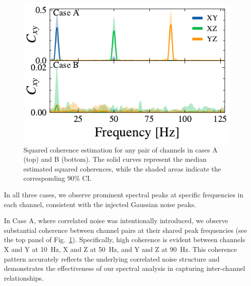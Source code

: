 \documentclass[%
 reprint,
 amsmath,amssymb,
 aps,
 nofootinbib,
]{revtex4-2}
\begin{document}
\begin{figure}
  \includegraphics[width=\columnwidth]{caseAB_coh.pdf}
  \caption{Squared coherence estimation for any pair of channels in cases A (top) and B (bottom). The solid curves represent the median estimated squared coherences, while the shaded areas indicate the corresponding 90\% CI.}
  \label{fig:squared_coh}
\end{figure}


In all three cases, we observe prominent spectral peaks at specific frequencies in each channel, consistent with the injected Gaussian noise peaks.

In Case A, where correlated noise was intentionally introduced, we observe substantial coherence between channel pairs at their shared peak frequencies (see the top panel of Fig.~\ref{fig:squared_coh}). 
Specifically, high coherence is evident between channels X and Y at \SI{10}{Hz}, X and Z at \SI{50}{Hz}, and Y and Z at \SI{90}{Hz}. 
This coherence pattern accurately reflects the underlying correlated noise structure and demonstrates the effectiveness of our spectral analysis in capturing inter-channel relationships.
\end{document}
